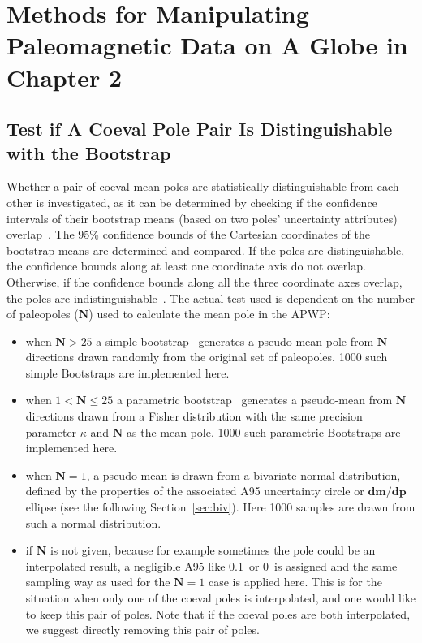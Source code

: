 \chapter{Methods for Manipulating Paleomagnetic Data on A Globe in Chapter
2}\label{appen4chp2}

\section{Test if A Coeval Pole Pair Is Distinguishable with the Bootstrap}
Whether a pair of coeval mean poles are statistically distinguishable from each
other is investigated, as it can be determined by checking if the confidence
intervals of their bootstrap means (based on two poles' uncertainty attributes)
overlap~\citep{T91}. The 95\% confidence bounds of the Cartesian coordinates of
the bootstrap means are determined and compared. If the poles are
distinguishable, the confidence bounds along at least one coordinate axis do not
overlap. Otherwise, if the confidence bounds along all the three coordinate axes
overlap, the poles are indistinguishable~\citep{T91}. The actual test used is
dependent on the number of paleopoles ($\mathbf{N}$) used to calculate the mean
pole in the APWP$\colon$

\begin{itemize}
\item when $\mathbf{N}>25$ a simple bootstrap~\citep{T91} generates a
pseudo-mean pole from $\mathbf{N}$ directions drawn randomly from the original
set of paleopoles. 1000 such simple Bootstraps are implemented here.
\item when $1<\mathbf{N}\leq25$ a parametric bootstrap~\citep{T91} generates a
pseudo-mean from $\mathbf{N}$ directions drawn from a Fisher distribution with
the same precision parameter $\kappa$ and $\mathbf{N}$ as the mean pole. 1000
such parametric Bootstraps are implemented here.
\item when $\mathbf{N}=1$, a pseudo-mean is drawn from a bivariate normal
distribution, defined by the properties of the associated A95 uncertainty
circle or $\mathbf{dm}/\mathbf{dp}$ ellipse (see the following
Section~\ref{sec:biv}). Here 1000 samples are drawn from such a normal
distribution.
\item if $\mathbf{N}$ is not given, because for example sometimes the pole could
be an interpolated result, a negligible A95 like 0.1\degree\ or 0\degree\ is
assigned and the same sampling way as used for the $\mathbf{N}=1$ case is
applied here. This is for the situation when only one of the coeval poles is
interpolated, and one would like to keep this pair of poles. Note that if the
coeval poles are both interpolated, we suggest directly removing this pair of
poles.
\end{itemize}

